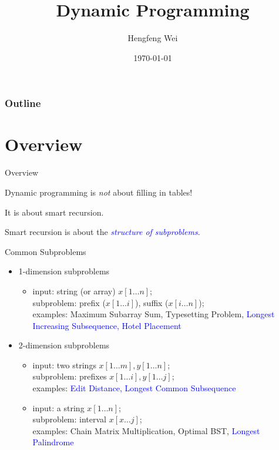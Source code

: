 \documentclass{beamer}
\title{Dynamic Programming}
\author{Hengfeng Wei}
\institute[Universities of]
{
	Institute of Computer Software, NJU
}
\date{\today}
\begin{document}
\begin{frame}
	\titlepage
\end{frame}

\begin{frame}
	\frametitle{Outline}
		\begin{multicols}{2}
		  \tableofcontents[currentsection]
		\end{multicols}
\end{frame}
\section{Overview}

\begin{frame}{Overview}
  \begin{mdframed}
    \begin{center}
    Dynamic programming is \emph{not} about filling in tables!
    
    It is about smart recursion.
    
    Smart recursion is about the \textcolor{blue}{\emph{structure of
    subproblems}}.
    \end{center}
  \end{mdframed}
\end{frame}
\begin{frame}{Common Subproblems}
  \begin{itemize}
    \setlength{\itemsep}{8pt}
    \item 1-dimension subproblems
      \begin{itemize}
        \item input: string (or array) $x[1 \ldots n]$;  \\
        subproblem: prefix ($x[1 \ldots i]$), suffix ($x[i \ldots n]$);  \\
        examples: Maximum Subarray Sum, Typesetting Problem,
        \textcolor{blue}{Longest Increasing Subsequence, Hotel Placement}
      \end{itemize}
    \item 2-dimension subproblems
      \begin{itemize}
        \setlength{\itemsep}{5pt}
        \item input: two strings $x[1 \ldots m], y[1 \ldots n]$; \\ 
        subproblem: prefixes $x[1 \ldots i], y[1 \ldots j]$;  \\
        examples: \textcolor{blue}{Edit Distance, Longest Common Subsequence}
        \item input: a string $x[1 \ldots n]$; \\
        subproblem: interval $x[x \ldots j]$;  \\
        examples: Chain Matrix Multiplication, Optimal BST,
        \textcolor{blue}{Longest Palindrome}
      \end{itemize}
  \end{itemize}
\end{frame}
\end{document}
